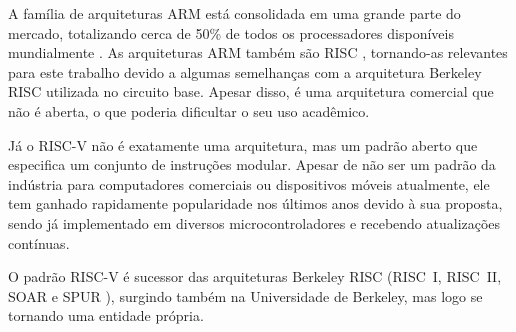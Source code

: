 \documentclass[
	12pt,				%
	openright,			%
	oneside,			%
	a4paper,			%
	english,			%
	french,				%
	spanish,			%
	brazil,				%
	]{abntex2}
\begin{document}
A família de arquiteturas ARM está consolidada em uma grande parte do mercado, totalizando cerca de 50\% de todos os processadores disponíveis mundialmente \cite{arm_building_nodate}. As arquiteturas ARM também são RISC \cite{arm_arm_2014}, tornando-as relevantes para este trabalho devido a algumas semelhanças com a arquitetura Berkeley RISC utilizada no circuito base. Apesar disso, é uma arquitetura comercial que não é aberta, o que poderia dificultar o seu uso acadêmico.

Já o RISC-V \cite{risc-v_risc-v_2024} não é exatamente uma arquitetura, mas um padrão aberto que especifica um conjunto de instruções modular. Apesar de não ser um padrão da indústria para computadores comerciais ou dispositivos móveis atualmente, ele tem ganhado rapidamente popularidade nos últimos anos devido à sua proposta, sendo já implementado em diversos microcontroladores e recebendo atualizações contínuas.

O padrão RISC-V é sucessor das arquiteturas Berkeley RISC (RISC~I, RISC~II, SOAR e SPUR \cite[p.10]{risc-v_risc-v_2024}), surgindo também na Universidade de Berkeley, mas logo se tornando uma entidade própria.
\end{document}
